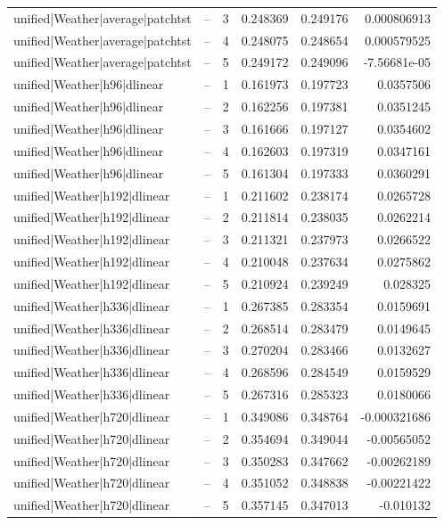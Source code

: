 \begin{longtable}{llrrrr}
unified|Weather|average|patchtst & -- & 3 & 0.248369 & 0.249176 & 0.000806913 \\
unified|Weather|average|patchtst & -- & 4 & 0.248075 & 0.248654 & 0.000579525 \\
unified|Weather|average|patchtst & -- & 5 & 0.249172 & 0.249096 & -7.56681e-05 \\
unified|Weather|h96|dlinear & -- & 1 & 0.161973 & 0.197723 & 0.0357506 \\
unified|Weather|h96|dlinear & -- & 2 & 0.162256 & 0.197381 & 0.0351245 \\
unified|Weather|h96|dlinear & -- & 3 & 0.161666 & 0.197127 & 0.0354602 \\
unified|Weather|h96|dlinear & -- & 4 & 0.162603 & 0.197319 & 0.0347161 \\
unified|Weather|h96|dlinear & -- & 5 & 0.161304 & 0.197333 & 0.0360291 \\
unified|Weather|h192|dlinear & -- & 1 & 0.211602 & 0.238174 & 0.0265728 \\
unified|Weather|h192|dlinear & -- & 2 & 0.211814 & 0.238035 & 0.0262214 \\
unified|Weather|h192|dlinear & -- & 3 & 0.211321 & 0.237973 & 0.0266522 \\
unified|Weather|h192|dlinear & -- & 4 & 0.210048 & 0.237634 & 0.0275862 \\
unified|Weather|h192|dlinear & -- & 5 & 0.210924 & 0.239249 & 0.028325 \\
unified|Weather|h336|dlinear & -- & 1 & 0.267385 & 0.283354 & 0.0159691 \\
unified|Weather|h336|dlinear & -- & 2 & 0.268514 & 0.283479 & 0.0149645 \\
unified|Weather|h336|dlinear & -- & 3 & 0.270204 & 0.283466 & 0.0132627 \\
unified|Weather|h336|dlinear & -- & 4 & 0.268596 & 0.284549 & 0.0159529 \\
unified|Weather|h336|dlinear & -- & 5 & 0.267316 & 0.285323 & 0.0180066 \\
unified|Weather|h720|dlinear & -- & 1 & 0.349086 & 0.348764 & -0.000321686 \\
unified|Weather|h720|dlinear & -- & 2 & 0.354694 & 0.349044 & -0.00565052 \\
unified|Weather|h720|dlinear & -- & 3 & 0.350283 & 0.347662 & -0.00262189 \\
unified|Weather|h720|dlinear & -- & 4 & 0.351052 & 0.348838 & -0.00221422 \\
unified|Weather|h720|dlinear & -- & 5 & 0.357145 & 0.347013 & -0.010132 \\

\end{longtable}

